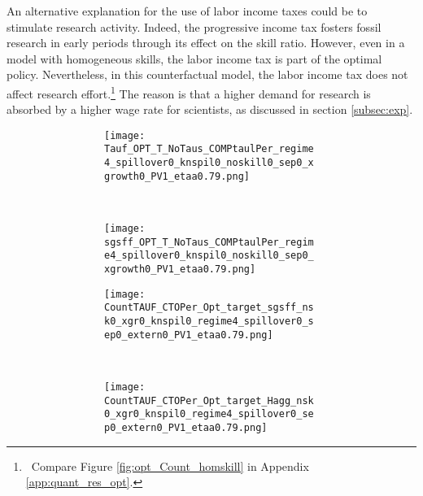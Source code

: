 An alternative explanation for the use of labor income taxes could be to stimulate research activity. 
Indeed, the progressive income tax fosters fossil research in early periods through its effect on the skill ratio. However, even in a model with homogeneous skills, the labor income tax is part of the optimal policy. Nevertheless, in this counterfactual model, the labor income tax does not affect research effort.\footnote{\ Compare Figure \ref{fig:opt_Count_homskill} in Appendix \ref{app:quant_res_opt}.}  The reason is that a higher demand for research is absorbed by a higher wage rate for scientists, as discussed in section \ref{subsec:exp}. 
\begin{figure}[h!!!]
	\centering
	\caption{Decomposing effect of combined policy}\label{fig:efftaul}
	\begin{subfigure}{1\textwidth}
		\caption{\textbf{Deviation of combined policy from carbon-tax-only policy in percent}}
		\vspace{3mm}
	\begin{subfigure}{0.4\textwidth}
		\texttt{[image: Tauf\_OPT\_T\_NoTaus\_COMPtaulPer\_regime4\_spillover0\_knspil0\_noskill0\_sep0\_xgrowth0\_PV1\_etaa0.79.png]}
	\end{subfigure}
\begin{minipage}[]{0.1\textwidth}
\
\end{minipage}
\begin{subfigure}{0.4\textwidth}
	\texttt{[image: sgsff\_OPT\_T\_NoTaus\_COMPtaulPer\_regime4\_spillover0\_knspil0\_noskill0\_sep0\_xgrowth0\_PV1\_etaa0.79.png]}
\end{subfigure}
\end{subfigure}

\vspace{3mm}
	\begin{subfigure}{1\textwidth}
	\caption{\textbf{Deviation only optimal carbon tax from carbon-tax-only policy in percent}}
	\vspace{3mm}
	\begin{subfigure}{0.4\textwidth}
		\texttt{[image: CountTAUF\_CTOPer\_Opt\_target\_sgsff\_nsk0\_xgr0\_knspil0\_regime4\_spillover0\_sep0\_extern0\_PV1\_etaa0.79.png]}
	\end{subfigure}
	\begin{minipage}[]{0.1\textwidth}
		\
	\end{minipage}
	\begin{subfigure}{0.4\textwidth}
		\texttt{[image: CountTAUF\_CTOPer\_Opt\_target\_Hagg\_nsk0\_xgr0\_knspil0\_regime4\_spillover0\_sep0\_extern0\_PV1\_etaa0.79.png]}
	\end{subfigure}
\end{subfigure}


\end{figure}
